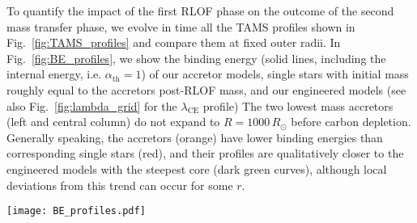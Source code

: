 \documentclass[twocolumn,twocolappendix,trackchanges]{aastex63}
\DeclareRobustCommand{\Eqref}[1]{Eq.~\ref{#1}}
\DeclareRobustCommand{\Figref}[1]{Fig.~\ref{#1}}
\newcommand{\todo}[1]{{\large $\blacksquare$~\textbf{\color{red}[#1]}}~$\blacksquare$}
\begin{document}
{To quantify the impact of the first RLOF phase on the outcome of the
second mass transfer phase, we evolve in time all the TAMS profiles
shown in \Figref{fig:TAMS_profiles} and compare them at fixed outer
radii. %
In \Figref{fig:BE_profiles}, we show the binding energy (solid lines,
including the internal energy, i.e. $\alpha_\mathrm{th}=1$) %
of our accretor models, single stars with initial mass roughly equal
to the accretors post-RLOF mass, and our engineered models (see also
\Figref{fig:lambda_grid} for the $\lambda_\mathrm{CE}$ profile) The two
lowest mass accretors (left and central column) do not expand to
$R=1000\, R_\odot$ before carbon depletion. Generally speaking, the
accretors (orange) have lower binding energies than corresponding
single stars (red), and their profiles are qualitatively closer to the
engineered models with the steepest core (dark green curves), although
local deviations from this trend can occur for some $r$.

\begin{figure*}[hbtp]
  \texttt{[image: BE\_profiles.pdf]}
  \caption{Binding energy profile at fixed radii (right y-axis) as a
    function of radial mass coordinate. We only show profiles with
    $\alpha_\mathrm{th}=1$, that is accounting for the internal energy
    content of the star. Orange, red, and other colors show
    respectively the accretor models, single stars of same post-RLOF
    total mass, and engineered models with varying CEB steepness.
    Titles indicates the pre-RLOF and approximate post-RLOF accretor
    masses, and vertical gray dashed lines mark the total radius $R$
    of these models.}
  \label{fig:BE_profiles}
\end{figure*}

}
\end{document}
